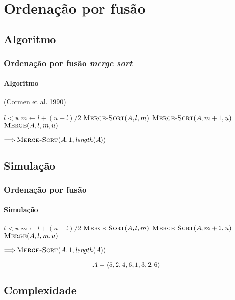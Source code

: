 \documentclass{beamer}
\begin{document}
\section{Ordenação por fusão}

\subsection{Algoritmo}

\begin{frame}

  \frametitle{Ordenação por fusão \textit{merge sort}}
  \framesubtitle{Algoritmo}

(Cormen et al. 1990)

\begin{codebox}
\li \If $l < u$
\li \Then $m \gets l + (u - l) / 2$
\li    $\textnormal{\scshape Merge-Sort}(A, l, m)$
\li    $\textnormal{\scshape Merge-Sort}(A, m+1, u)$
\li    $\textnormal{\scshape Merge}(A, l, m, u)$
\zi \End
\end{codebox}  

$\Longrightarrow \proc{Merge-Sort}(A, 1, \id{length}(A))$

\end{frame}

\subsection{Simulação}

\begin{frame}

  \frametitle{Ordenação por fusão}
  \framesubtitle{Simulação}

\begin{codebox}
\li \If $l < u$
\li \Then    $m \gets l + (u - l) / 2$
\li    $\textnormal{\scshape Merge-Sort}(A, l, m)$
\li    $\textnormal{\scshape Merge-Sort}(A, m+1, u)$
\li    $\textnormal{\scshape Merge}(A, l, m, u)$
\zi \End
\end{codebox}  

$\Longrightarrow \proc{Merge-Sort}(A, 1, \id{length}(A))$

\alert{$$A = \langle 5, 2, 4, 6, 1, 3, 2, 6 \rangle$$}

\end{frame}

\subsection{Complexidade}
\end{document}
